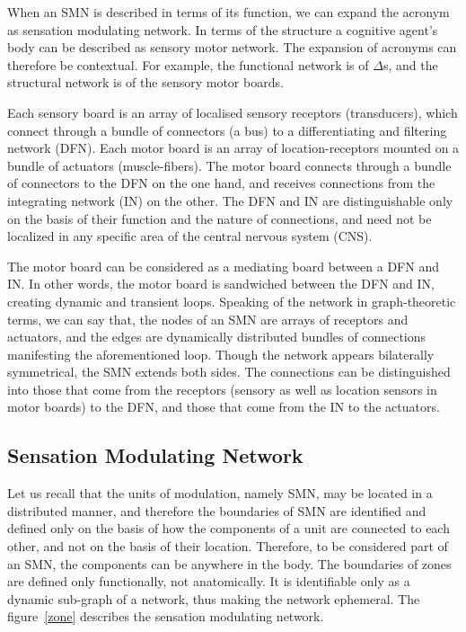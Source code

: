 When an SMN is described in terms of its function, we can expand the acronym as sensation modulating network. In terms of the structure a cognitive agent's body can be described as sensory motor network. The expansion of acronyms can therefore be contextual. For example, the functional network is of $\Delta$s, and the structural network is of the sensory motor boards.

Each sensory board is an array of localised sensory receptors (transducers), which connect through a bundle of connectors (a bus) to a differentiating and filtering network (DFN). Each motor board is an array of location-receptors mounted on a bundle of actuators (muscle-fibers). The motor board connects through a bundle of connectors to the DFN on the one hand, and receives connections from the integrating network (IN) on the other. The DFN and IN are distinguishable only on the basis of their function and the nature of connections, and need not be localized in any specific area of the central nervous system (CNS).

The motor board can be considered as a mediating board between a DFN and IN. In other words, the motor board is sandwiched between the DFN and IN, creating dynamic and transient loops. Speaking of the network in graph-theoretic terms, we can say that, the nodes of an SMN are arrays of receptors and actuators, and the edges are dynamically distributed bundles of connections manifesting the aforementioned loop.
Though the network appears bilaterally symmetrical, the SMN extends both sides. The connections can be distinguished into those that come from the receptors (sensory as well as location sensors in motor boards) to the DFN, and those that come from the IN to the actuators.




\subsection{Sensation Modulating Network}
Let us recall that the units of modulation, namely SMN, may be located in a distributed manner, and therefore the boundaries of SMN are identified and defined only on the basis of how the components of a unit are connected to each other, and not on the basis of their location. Therefore, to be considered part of an SMN, the components can be anywhere in the body. The boundaries of zones are defined only functionally, not anatomically. It is identifiable only as a dynamic sub-graph of a network, thus making the network ephemeral. The figure~\ref{zone} describes the sensation modulating network.

